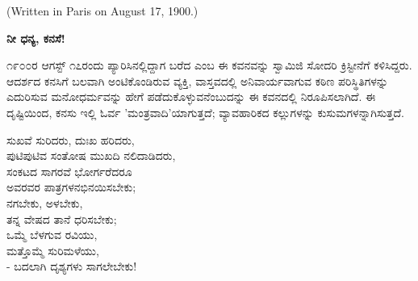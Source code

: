 \begin{center}
(Written in Paris on August 17, 1900.)
\end{center}

\begin{myquote}
\end{myquote}

\begin{myquote}
\end{myquote}

\begin{myquote}
\end{myquote}

\selectkan

\begin{center}
\textbf{ನೀ ಧನ್ಯ, ಕನಸೆ!}
\end{center}

೧೯೦೦ರ ಆಗಸ್ಟ್ ೧೭ರಂದು ಪ್ಯಾರಿಸಿನಲ್ಲಿದ್ದಾಗ ಬರೆದ  ಎಂಬ ಈ ಕವನವನ್ನು ಸ್ವಾಮಿಜಿ ಸೋದರಿ ಕ್ರಿಸ್ಟೀನೆಗೆ ಕಳಿಸಿದ್ದರು. ಆದರ್ಶದ ಕನಸಿಗೆ ಬಲವಾಗಿ ಅಂಟಿಕೊಂಡಿರುವ ವ್ಯಕ್ತಿ, ವಾಸ್ತವದಲ್ಲಿ ಅನಿವಾರ್ಯವಾಗುವ ಕಠಿಣ ಪರಿಸ್ಥಿತಿಗಳನ್ನು ಎದುರಿಸುವ ಮನೋಧರ್ಮವನ್ನು ಹೇಗೆ ಪಡೆದುಕೊಳ್ಳುವನೆಂಬುದನ್ನು ಈ ಕವನದಲ್ಲಿ ನಿರೂಪಿಸಲಾಗಿದೆ. ಈ ದೃಷ್ಟಿಯಿಂದ, ಕನಸು ಇಲ್ಲಿ ಓರ್ವ 'ಮಂತ್ರವಾದಿ'ಯಾಗುತ್ತದೆ; ವ್ಯಾವಹಾರಿಕದ ಕಲ್ಲುಗಳನ್ನು ಕುಸುಮಗಳನ್ನಾಗಿಸುತ್ತದೆ.

\begin{myquote}
ಸುಖವೆ ಸುರಿದರು, ದುಃಖ ಹರಿದರು,\\ಪುಟಿಪುಟಿವ ಸಂತೋಷ ಮುಖದಿ ನಲಿದಾಡಿದರು,\\ಸಂಕಟದ ಸಾಗರವೆ ಭೋರ್ಗರೆದರೂ\\ಅವರವರ ಪಾತ್ರಗಳನಭಿನಯಿಸಬೇಕು;\\ನಗಬೇಕು, ಅಳಬೇಕು,\\ತನ್ನ ವೇಷದ ತಾನೆ ಧರಿಸಬೇಕು;\\ಒಮ್ಮೆ ಬೆಳಗುವ ರವಿಯು,\\ಮತ್ತೊಮ್ಮೆ ಸುರಿಮಳೆಯು,\\- ಬದಲಾಗಿ ದೃಶ್ಯಗಳು ಸಾಗಲೇಬೇಕು!
\end{myquote}

